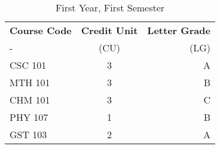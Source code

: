 \documentclass{article}
\begin{document}
	
\begin{table}[h!]
 \begin{center}
 	\caption{First Year, First Semester}
 	\label{tab:table1}
 	\begin{tabular}{l|c|r|}
 		\textbf{Course Code} & \textbf{Credit Unit} & 
 		\textbf{Letter Grade}\\
 		- & (CU) & (LG)\\
 		\hline
 		CSC 101 & 3 & A\\
 		MTH 101 & 3 & B\\
 		CHM 101 & 3 & C\\
 		PHY 107 & 1 & B\\
 		GST 103 & 2 & A\\
 	\end{tabular}
 \end{center}
\end{table}
\end{document}
